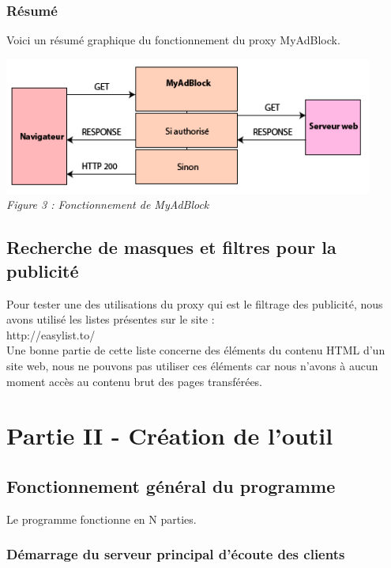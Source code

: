 \documentclass{scrreprt}
\begin{document}
\subsection{Résumé}
Voici un résumé graphique du fonctionnement du proxy MyAdBlock.

\begin{center}
  \includegraphics[height=4.5cm]{images/f3.png}
  \\
  \textit{Figure 3 : Fonctionnement de MyAdBlock}
\end{center}


\section{Recherche de masques et filtres pour la publicité}
Pour tester une des utilisations du proxy qui est le filtrage des publicité, nous avons utilisé les listes présentes sur le site :\\
http://easylist.to/\\
Une bonne partie de cette liste concerne des éléments du contenu HTML d'un site web, nous ne pouvons pas utiliser ces éléments car nous n'avons à aucun moment accès au contenu brut des pages transférées.

\chapter{Partie II - Création de l'outil}

\section{Fonctionnement général du programme}
Le programme fonctionne en N parties.

\subsection{Démarrage du serveur principal d'écoute des clients}
\end{document}
